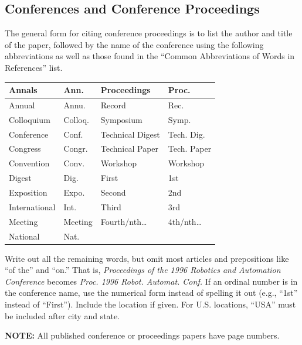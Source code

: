 \documentclass[10pt]{article}
\begin{document}
\subsection{Conferences and Conference Proceedings}

The general form for citing conference proceedings is to list the author and title of the paper, followed by the name of the conference using the following abbreviations as well as those found in the “Common Abbreviations of Words in References” list.

\begin{center}
\begin{tabular}{|l|l|l|l|}
\hline
Annals & Ann. & Proceedings & Proc. \\ \hline
Annual & Annu. & Record & Rec. \\ \hline
Colloquium & Colloq. & Symposium & Symp. \\ \hline
Conference & Conf. & Technical Digest & Tech. Dig. \\ \hline
Congress & Congr. & Technical Paper & Tech. Paper \\ \hline
Convention & Conv. & Workshop & Workshop \\ \hline
Digest & Dig. & First & 1st \\ \hline
Exposition & Expo. & Second & 2nd \\ \hline
International & Int. & Third & 3rd \\ \hline
Meeting & Meeting & Fourth/nth\dots & 4th/nth\dots \\ \hline
National & Nat. &  &  \\ \hline
\end{tabular}
\end{center}

Write out all the remaining words, but omit most articles and prepositions like “of the” and “on.” That is, \textit{Proceedings of the 1996 Robotics and Automation Conference} becomes \textit{Proc. 1996 Robot. Automat. Conf.} If an ordinal number is in the conference name, use the numerical form instead of spelling it out (e.g., “1st” instead of “First”). Include the location if given. For U.S. locations, “USA” must be included after city and state.

\textbf{NOTE:} All published conference or proceedings papers have page numbers.
\end{document}
